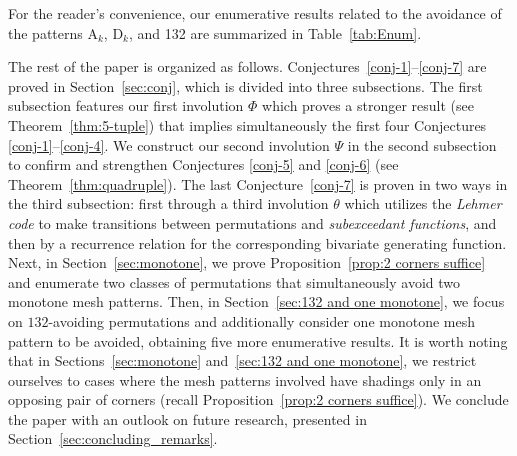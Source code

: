 \documentclass[12pt,reqno]{article}
\numberwithin{equation}{section}
\theoremstyle{plain}
\theoremstyle{definition}
\def\rA{\mathrm{A}}
\def\rD{\mathrm{D}}
\begin{document}
For the reader's convenience, our enumerative results related to the avoidance of the patterns \( \rA_k \), \( \rD_k \), and 132 are summarized in Table~\ref{tab:Enum}.

The rest of the paper is organized as follows. Conjectures~\ref{conj-1}--\ref{conj-7} are proved in Section~\ref{sec:conj}, which is divided into three subsections. The first subsection features our first involution $\Phi$ which proves a stronger result (see Theorem~\ref{thm:5-tuple}) that implies simultaneously the first four Conjectures \ref{conj-1}--\ref{conj-4}. We construct our second involution $\Psi$ in the second subsection to confirm and strengthen Conjectures \ref{conj-5} and \ref{conj-6} (see Theorem~\ref{thm:quadruple}). The last Conjecture~\ref{conj-7} is proven in two ways in the third subsection: first through a third involution $\theta$ which utilizes the {\it Lehmer code} to make transitions between permutations and {\it subexceedant functions}, and then by a recurrence relation for the corresponding bivariate generating function. Next, in Section~\ref{sec:monotone}, we prove Proposition~\ref{prop:2 corners suffice} and enumerate two classes of permutations that simultaneously avoid two monotone mesh patterns. Then, in Section~\ref{sec:132 and one monotone}, we focus on $132$-avoiding permutations and additionally consider one monotone mesh pattern to be avoided, obtaining five more enumerative results. It is worth noting that in Sections~\ref{sec:monotone} and~\ref{sec:132 and one monotone}, we restrict ourselves to cases where the mesh patterns involved have shadings only in an opposing pair of corners (recall Proposition~\ref{prop:2 corners suffice}). We conclude the paper with an outlook on future research, presented in Section~\ref{sec:concluding_remarks}.
\end{document}
